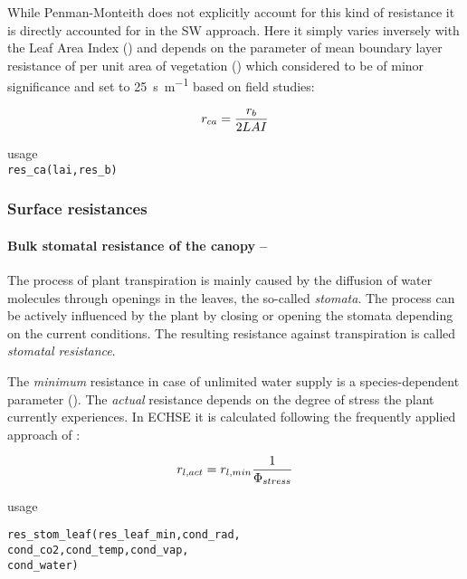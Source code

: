 While Penman-Monteith does not explicitly account for this kind of resistance it is directly accounted for in the SW approach. Here it simply varies inversely with the Leaf Area Index (\leafAreaIndex{}) and depends on the parameter of mean boundary layer resistance of per unit area of vegetation (\resMeanBound{}) which \citet{Shuttleworth1985} considered to be of minor significance and set to \SI{25}{\second\per\metre} based on field studies:

\begin{equation} \label{eqn:et:res:rca}
r_{ca} = \frac{r_{b}}{2 LAI}
\end{equation}

\noindent
usage\\
\verb!res_ca(lai,res_b)!


\subsubsection{Surface resistances}
\paragraph{Bulk stomatal resistance of the canopy -- \resCanopy{}} \label{sec:et:res:rcs}
The process of plant transpiration is mainly caused by the diffusion of water molecules through openings in the leaves, the so-called \emph{stomata}. The process can be actively influenced by the plant by closing or opening the stomata depending on the current conditions. The resulting resistance against transpiration is called \emph{stomatal resistance}.

The \emph{minimum} resistance in case of unlimited water supply is a species-dependent parameter (\resLeafMin{}). The \emph{actual} resistance depends on the degree of stress the plant currently experiences. In ECHSE it is calculated following the frequently applied approach of \citet{Jarvis1976}:

\begin{equation} \label{eqn:et:res:jarvis}
r_{l,act} = r_{l,min} \frac{1}{\Phi_{stress}}
\end{equation}

\noindent
usage
\begin{verbatim}
res_stom_leaf(res_leaf_min,cond_rad,
cond_co2,cond_temp,cond_vap,
cond_water)
\end{verbatim}

